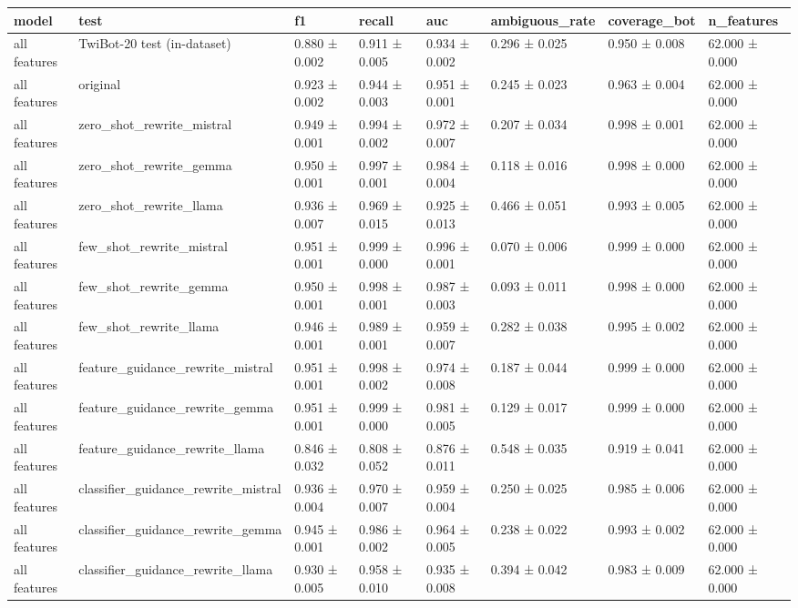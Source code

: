 \begin{tabular}{llllllll}
\toprule
model & test & f1 & recall & auc & ambiguous_rate & coverage_bot & n_features \\
\midrule
all features & TwiBot-20 test (in-dataset) & 0.880 ± 0.002 & 0.911 ± 0.005 & 0.934 ± 0.002 & 0.296 ± 0.025 & 0.950 ± 0.008 & 62.000 ± 0.000 \\
all features & original & 0.923 ± 0.002 & 0.944 ± 0.003 & 0.951 ± 0.001 & 0.245 ± 0.023 & 0.963 ± 0.004 & 62.000 ± 0.000 \\
all features & zero_shot_rewrite_mistral & 0.949 ± 0.001 & 0.994 ± 0.002 & 0.972 ± 0.007 & 0.207 ± 0.034 & 0.998 ± 0.001 & 62.000 ± 0.000 \\
all features & zero_shot_rewrite_gemma & 0.950 ± 0.001 & 0.997 ± 0.001 & 0.984 ± 0.004 & 0.118 ± 0.016 & 0.998 ± 0.000 & 62.000 ± 0.000 \\
all features & zero_shot_rewrite_llama & 0.936 ± 0.007 & 0.969 ± 0.015 & 0.925 ± 0.013 & 0.466 ± 0.051 & 0.993 ± 0.005 & 62.000 ± 0.000 \\
all features & few_shot_rewrite_mistral & 0.951 ± 0.001 & 0.999 ± 0.000 & 0.996 ± 0.001 & 0.070 ± 0.006 & 0.999 ± 0.000 & 62.000 ± 0.000 \\
all features & few_shot_rewrite_gemma & 0.950 ± 0.001 & 0.998 ± 0.001 & 0.987 ± 0.003 & 0.093 ± 0.011 & 0.998 ± 0.000 & 62.000 ± 0.000 \\
all features & few_shot_rewrite_llama & 0.946 ± 0.001 & 0.989 ± 0.001 & 0.959 ± 0.007 & 0.282 ± 0.038 & 0.995 ± 0.002 & 62.000 ± 0.000 \\
all features & feature_guidance_rewrite_mistral & 0.951 ± 0.001 & 0.998 ± 0.002 & 0.974 ± 0.008 & 0.187 ± 0.044 & 0.999 ± 0.000 & 62.000 ± 0.000 \\
all features & feature_guidance_rewrite_gemma & 0.951 ± 0.001 & 0.999 ± 0.000 & 0.981 ± 0.005 & 0.129 ± 0.017 & 0.999 ± 0.000 & 62.000 ± 0.000 \\
all features & feature_guidance_rewrite_llama & 0.846 ± 0.032 & 0.808 ± 0.052 & 0.876 ± 0.011 & 0.548 ± 0.035 & 0.919 ± 0.041 & 62.000 ± 0.000 \\
all features & classifier_guidance_rewrite_mistral & 0.936 ± 0.004 & 0.970 ± 0.007 & 0.959 ± 0.004 & 0.250 ± 0.025 & 0.985 ± 0.006 & 62.000 ± 0.000 \\
all features & classifier_guidance_rewrite_gemma & 0.945 ± 0.001 & 0.986 ± 0.002 & 0.964 ± 0.005 & 0.238 ± 0.022 & 0.993 ± 0.002 & 62.000 ± 0.000 \\
all features & classifier_guidance_rewrite_llama & 0.930 ± 0.005 & 0.958 ± 0.010 & 0.935 ± 0.008 & 0.394 ± 0.042 & 0.983 ± 0.009 & 62.000 ± 0.000 \\

\end{tabular}
